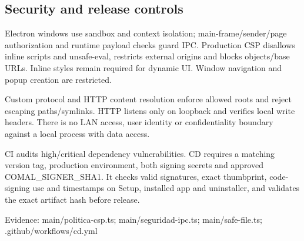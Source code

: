 \subsection{Security and release controls}

Electron windows use sandbox and context isolation; main-frame/sender/page authorization and runtime payload checks guard IPC. Production CSP disallows inline scripts and unsafe-eval, restricts external origins and blocks objects/base URLs. Inline styles remain required for dynamic UI. Window navigation and popup creation are restricted.

Custom protocol and HTTP content resolution enforce allowed roots and reject escaping paths/symlinks. HTTP listens only on loopback and verifies local write headers. There is no LAN access, user identity or confidentiality boundary against a local process with data access.

CI audits high/critical dependency vulnerabilities. CD requires a matching version tag, production environment, both signing secrets and approved COMAL\_SIGNER\_SHA1. It checks valid signatures, exact thumbprint, code-signing use and timestamps on Setup, installed app and uninstaller, and validates the exact artifact hash before release.

Evidence: main/politica-csp.ts; main/seguridad-ipc.ts; main/safe-file.ts; .github/workflows/cd.yml
